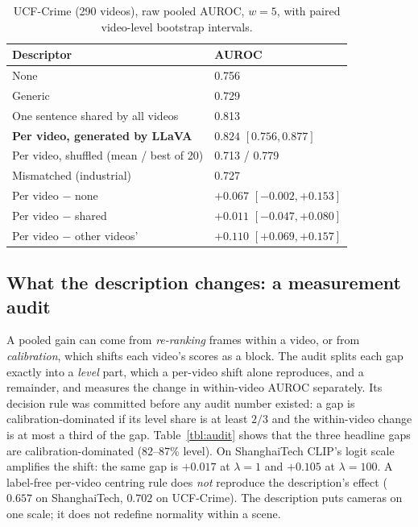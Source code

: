 \documentclass[conference,a4paper]{IEEEtran}
\begin{document}
\begin{table}[!t]
\caption{UCF-Crime (290 videos), raw pooled AUROC, $w{=}5$, with paired
video-level bootstrap intervals.}
\label{tbl:ucf}
\centering
\footnotesize
\begin{tabularx}{\columnwidth}{@{}Z l@{}}
\toprule
\textbf{Descriptor} & \textbf{AUROC} \\
\midrule
None & 0.756 \\
Generic & 0.729 \\
One sentence shared by all videos & 0.813 \\
\textbf{Per video, generated by LLaVA} & $\mathbf{0.824}$ $[0.756, 0.877]$ \\
Per video, shuffled (mean / best of 20) & 0.713 / 0.779 \\
Mismatched (industrial) & 0.727 \\
\midrule
Per video $-$ none & $+0.067$ $[-0.002, +0.153]$ \\
Per video $-$ shared & $+0.011$ $[-0.047, +0.080]$ \\
Per video $-$ other videos' & $+0.110$ $[+0.069, +0.157]$ \\
\bottomrule
\end{tabularx}
\end{table}

\subsection{What the description changes: a measurement audit}
\label{sec:p1-audit}
A pooled gain can come from \emph{re-ranking} frames within a video, or from
\emph{calibration}, which shifts each video's scores as a block. The audit splits
each gap exactly into a \emph{level} part, which a per-video shift alone
reproduces, and a remainder, and measures the change in within-video AUROC
separately. Its decision rule was committed before any audit number existed: a
gap is calibration-dominated if its level share is at least $2/3$ and the
within-video change is at most a third of the gap. Table~\ref{tbl:audit} shows
that the three headline gaps are calibration-dominated ($82$--$87\%$ level). On
ShanghaiTech CLIP's logit scale amplifies the shift: the same gap is $+0.017$ at
$\lambda=1$ and $+0.105$ at $\lambda=100$. A label-free per-video centring rule
does \emph{not} reproduce the description's effect ($0.657$ on ShanghaiTech,
$0.702$ on UCF-Crime). The description puts cameras on one scale; it does not
redefine normality within a scene.
\end{document}
